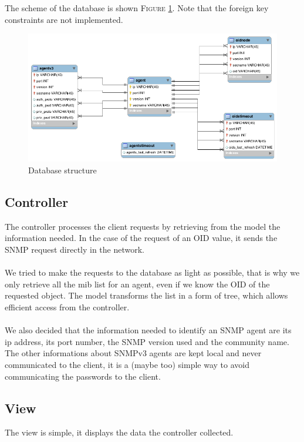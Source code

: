 \documentclass[a4paper,titlepage]{article}
\begin{document}
The scheme of the database is shown \textsc{Figure} \ref{db}. Note that the foreign key constraints are not implemented.
\begin{figure}
	\centering
	\includegraphics[scale=0.55]{db.png}
	\caption{Database structure}
	\label{db}
\end{figure}

\subsection{Controller}
The controller processes the client requests by retrieving from the model the information needed. In the case of the request of an OID value, it sends the SNMP request directly in the network.

\paragraph{}

We tried to make the requests to the database as light as possible, that is why we only retrieve all the mib list for an agent, even if we know the OID of the requested object. The model transforms the list in a form of tree, which allows efficient access from the controller.

\paragraph{}

We also decided that the information needed to identify an SNMP agent are its ip address, its port number, the SNMP version used and the community name. The other informations about SNMPv3 agents are kept local and never communicated to the client, it is a (maybe too) simple way to avoid communicating the passwords to the client. 


\subsection{View}
The view is simple, it displays the data the controller collected. 
\end{document}
